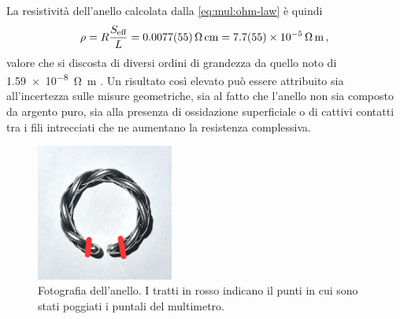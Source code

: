                 La resistività dell'anello calcolata dalla \eqref{eq:mul:ohm-law} è quindi
                \begin{equation*}
                    \rho = R\frac{S_\text{eff}}{L} = \SI{0.0077(55)}{\ohm\centi\meter} = \SI{7.7(55)e-5}{\ohm\meter}
                    \mycomma
                \end{equation*}
                valore che si discosta di diversi ordini di grandezza da quello noto di \SI{1.59e-8}{\ohm\meter} \cite{Griffiths2012-qz}. Un risultato così elevato può essere attribuito sia all'incertezza sulle misure geometriche, sia al fatto che l'anello non sia composto da argento puro, sia alla presenza di ossidazione superficiale o di cattivi contatti tra i fili intrecciati che ne aumentano la resistenza complessiva.
                \begin{figure}
                    \centering
                    \includegraphics[width=0.4\textwidth]{images/multimetro/anello.jpg}
                    \caption{Fotografia dell'anello. I tratti in rosso indicano il punti in cui sono stati poggiati i puntali del multimetro.}
                    \label{fig:mul:anello}
                \end{figure}


